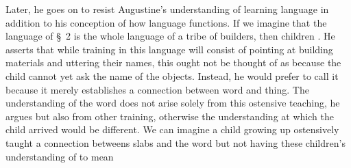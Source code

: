 \documentclass[doc,12pt,apacite,biblatex]{apa6}
\begin{document}
Later, he goes on to resist Augustine's understanding of learning language 
in addition to his conception of how language functions. If we imagine that the
language of \S~2 is the whole language of a tribe of builders, then children
\cite[\S~6]{Wittgenstein53}. He asserts that while training in this language
will consist of pointing at building materials and uttering their names, this
ought not be thought of as  because the child cannot
yet ask the name of the objects. Instead, he would prefer to call it
 because it merely establishes a connection
between word and thing. The understanding of the word does not arise solely
from this ostensive teaching, he argues but also from other training, otherwise
the understanding at which the child arrived would be different. We can imagine
a child growing up ostensively taught a connection betweens slabs and the word
 but not having these children's understanding of  to
mean 
\end{document}
